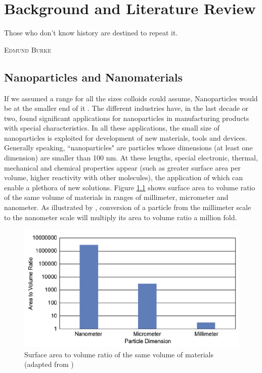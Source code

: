 \chapter{Background and Literature Review} \label{chap:background}
\vspace*{\fill}
\epigraph{Those who don't know history are destined to repeat it.}%
{\textsc{Edmund Burke}}
\clearpage{\thispagestyle{empty}\cleardoublepage}
\section{Nanoparticles and Nanomaterials}
If we assumed a range for all the sizes colloids could assume, Nanoparticles  would be at the smaller end of it \citep{Goodwin2009}. The different industries have, in the last decade or two, found significant applications for nanoparticles in manufacturing products with special characteristics. In all these applications, the small size of nanoparticles is exploited for development of new materials, tools and devices. Generally speaking, ``nanoparticles" are particles whose dimensions (at least one dimension) are smaller than 100 nm. At these lengths, special electronic, thermal, mechanical and chemical properties appear (such as greater surface area per volume, higher reactivity with other molecules), the application of which can enable a plethora of new solutions. Figure \ref{cht:NPsurfaceVolume} shows surface area to volume ratio of the same volume of materials in ranges of millimeter, micrometer and nanometer. As illustrated by \citet{Amanullah2009}, conversion of a particle from the millimeter scale to the nanometer scale will multiply its area to volume ratio a million fold. 
\begin{figure}[h]
    \centering
    \includegraphics[width=\textwidth]{img/cht/NPsurfaceVolume.png}
    \caption{Surface area to volume ratio of the same volume of materials (adapted from \citet{Amanullah2009})}
    \label{cht:NPsurfaceVolume}
\end{figure}

